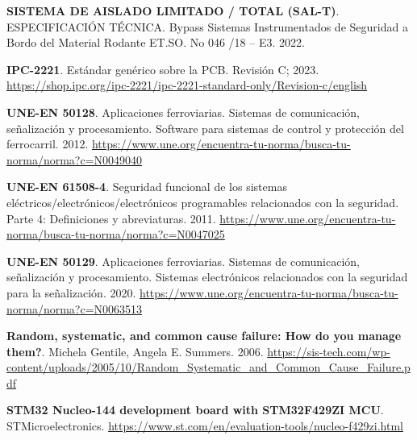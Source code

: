 \begin{thebibliography}{30}
 \textbf{SISTEMA DE AISLADO LIMITADO / TOTAL (SAL-T)}. ESPECIFICACIÓN TÉCNICA. Bypass Sistemas Instrumentados de Seguridad a Bordo del Material Rodante ET.SO. No 046 /18 – E3. 2022.

  



\textbf{IPC-2221}. Estándar genérico sobre la PCB. Revisión C; 2023. \href{https://shop.ipc.org/ipc-2221/ipc-2221-standard-only/Revision-c/english}{https://shop.ipc.org/ipc-2221/ipc-2221-standard-only/Revision-c/english}



\textbf{UNE-EN 50128}. Aplicaciones ferroviarias. Sistemas de comunicación, señalización y procesamiento. Software para sistemas de control y protección del ferrocarril. 2012. \href{https://www.une.org/encuentra-tu-norma/busca-tu-norma/norma?c=N0049040}{https://www.une.org/encuentra-tu-norma/busca-tu-norma/norma?c=N0049040} 


\textbf{UNE-EN 61508-4}. Seguridad funcional de los sistemas eléctricos/electrónicos/electrónicos programables relacionados con la seguridad. Parte 4: Definiciones y abreviaturas. 2011. \href{https://www.une.org/encuentra-tu-norma/busca-tu-norma/norma?c=N0047025}{https://www.une.org/encuentra-tu-norma/busca-tu-norma/norma?c=N0047025} 



\textbf{UNE-EN 50129}. Aplicaciones ferroviarias. Sistemas de comunicación, señalización y procesamiento. Sistemas electrónicos relacionados con la seguridad para la señalización. 2020. \href{https://www.une.org/encuentra-tu-norma/busca-tu-norma/norma?c=N0063513}{https://www.une.org/encuentra-tu-norma/busca-tu-norma/norma?c=N0063513} 




\textbf{Random, systematic, and common cause failure: How do you manage them?}. Michela Gentile, Angela E. Summers. 2006. \href{https://sis-tech.com/wp-content/uploads/2005/10/Random_Systematic_and_Common_Cause_Failure.pdf}{https://sis-tech.com/wp-content/uploads/2005/10/Random\_Systematic\_and\_Common\_Cause\_Failure.pdf} 

\textbf{STM32 Nucleo-144 development board with STM32F429ZI MCU}. STMicroelectronics. \href{https://www.st.com/en/evaluation-tools/nucleo-f429zi.html}{https://www.st.com/en/evaluation-tools/nucleo-f429zi.html} 


\end{thebibliography}
